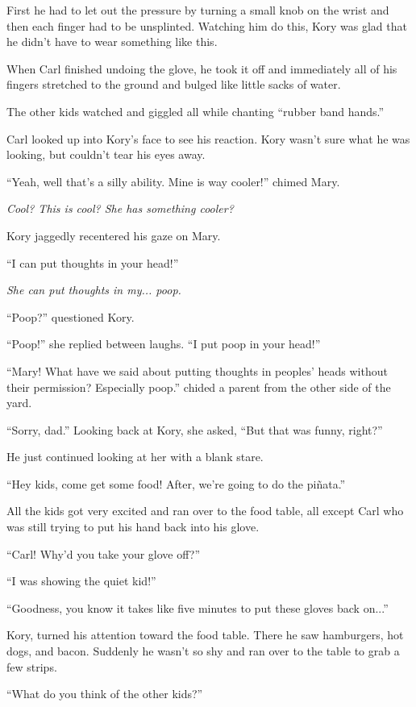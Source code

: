 First he had to let out the pressure by turning a small knob on the wrist and then each finger had to be unsplinted. Watching him do this, Kory was glad that he didn't have to wear something like this.

When Carl finished undoing the glove, he took it off and immediately all of his fingers stretched to the ground and bulged like little sacks of water.

The other kids watched and giggled all while chanting ``rubber band hands.''

Carl looked up into Kory's face to see his reaction. Kory wasn't sure what he was looking, but couldn't tear his eyes away.

``Yeah, well that's a silly ability. Mine is way cooler!'' chimed Mary.

\textit{Cool? This is cool? She has something cooler?}

Kory jaggedly recentered his gaze on Mary.

``I can put thoughts in your head!''

\textit{She can put thoughts in my... poop.}

``Poop?'' questioned Kory.

``Poop!'' she replied between laughs. ``I put poop in your head!''

``Mary! What have we said about putting thoughts in peoples' heads without their permission? Especially poop.'' chided a parent from the other side of the yard.

``Sorry, dad.'' Looking back at Kory, she asked, ``But that was funny, right?''

He just continued looking at her with a blank stare.

``Hey kids, come get some food! After, we're going to do the piñata.''

All the kids got very excited and ran over to the food table, all except Carl who was still trying to put his hand back into his glove.

``Carl! Why'd you take your glove off?''

``I was showing the quiet kid!''

``Goodness, you know it takes like five minutes to put these gloves back on...''

Kory, turned his attention toward the food table. There he saw hamburgers, hot dogs, and bacon. Suddenly he wasn't so shy and ran over to the table to grab a few strips.

``What do you think of the other kids?''

